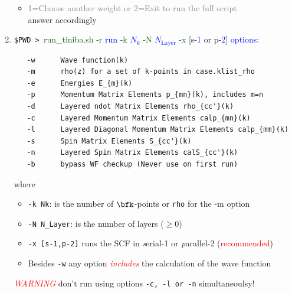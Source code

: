 \documentclass[12pt,leqno]{article}
\numberwithin{equation}{section}
\begin{document}
\begin{enumerate}
\begin{itemize}
\item \textcolor{gray}{1=Choose another weight or
	2=Exit to run the full script}\\answer accordingly
\end{itemize}
\newpage
\item 
 \verb=$PWD > =\textcolor{darkgreen}{run\_tiniba.sh}
\textcolor{darkgreen}{-r} \textcolor{blue}{run} 
\textcolor{darkgreen}{-k} \textcolor{blue}{$N_k$} 
\textcolor{darkgreen}{-N} \textcolor{blue}{$N_{\mathrm{Layer}}$} 
\textcolor{darkgreen}{-x} [s-\textcolor{blue}{1} or
p-\textcolor{blue}{2}] \textcolor{blue}{options:}  
\begin{verbatim}
   -w      Wave function(k)
   -m      rho(z) for a set of k-points in case.klist_rho
   -e      Energies E_{m}(k)
   -p      Momentum Matrix Elements p_{mn}(k), includes m=n
   -d      Layered ndot Matrix Elements rho_{cc'}(k) 
   -c      Layered Momentum Matrix Elements calp_{mn}(k)
   -l      Layered Diagonal Momentum Matrix Elements calp_{mm}(k)
   -s      Spin Matrix Elements S_{cc'}(k)
   -n      Layered Spin Matrix Elements calS_{cc'}(k)
   -b      bypass WF checkup (Never use on first run)
\end{verbatim}
where
\begin{itemize}
\item \verb=-k Nk=: is the number of $\bfk$-points or \verb=rho= for
the  -m option
\item \verb=-N N_Layer=: is the number of
layers ($\geq 0$) %
\item \verb=-x [s-1,p-2]= runs the SCF in {\it s}erial-1 or {\it p}arallel-2 (\textcolor{red}{recommended})
\item Besides \verb=-w= 
any option \textcolor{red}{{\it includes}} the
   calculation of the wave function
\end{itemize}


\textcolor{red}{{\it WARNING}} don't run using options 
\verb=-c, -l or -n= simultaneoulsy!


\end{enumerate}
\end{document}
